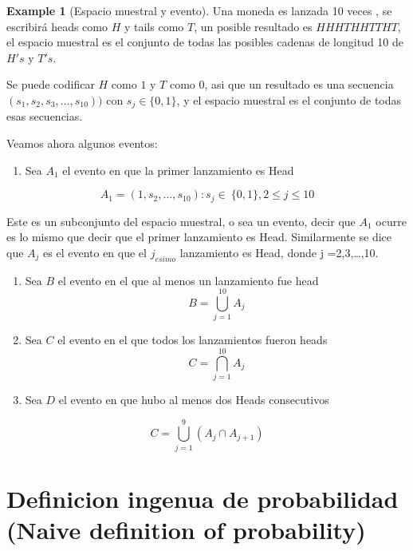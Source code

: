 \documentclass[
]{book}
\providecommand{\tightlist}{%
  \setlength{\itemsep}{0pt}\setlength{\parskip}{0pt}}
\theoremstyle{definition}
\theoremstyle{definition}
\newtheorem{example}{Example}[chapter]
\theoremstyle{definition}
\theoremstyle{definition}
\theoremstyle{remark}
\begin{document}
\begin{example}[Espacio muestral y evento]
\protect\hypertarget{exm:coins}{}\label{exm:coins}Una moneda es lanzada 10 veces , se escribirá heads como \(H\) y tails como \(T\), un posible resultado es \(HHHTHHTTHT\), el espacio muestral es el conjunto de todas las posibles cadenas de longitud 10 de \(H's\) y \(T's\).

Se puede codificar \(H\) como \(1\) y \(T\) como \(0\), asi que un resultado es una secuencia \((s_1,s_2,s_3, ..., s_{10}))\) con \(s_j \in \{0, 1\}\), y el espacio muestral es el conjunto de todas esas secuencias.

Veamos ahora algunos eventos:

\begin{enumerate}
\def\labelenumi{\arabic{enumi}.}
\tightlist
\item
  Sea \(A_1\) el evento en que la primer lanzamiento es Head
\end{enumerate}

\[ A_1 = {(1,s_2, ...,s_{10}) }: s_j \in\ \{0,1\} , 2 \leq j  \leq  10\]

Este es un subconjunto del espacio muestral, o sea un evento, decir que \(A_1\) ocurre es lo mismo que decir que el primer lanzamiento es Head. Similarmente se dice que \(A_j\) es el evento en que el \(j_{esimo}\) lanzamiento es Head, donde j =2,3,\ldots,10.

\begin{enumerate}
\def\labelenumi{\arabic{enumi}.}
\setcounter{enumi}{1}
\item
  Sea \(B\) el evento en el que al menos un lanzamiento fue head \[ B =   \bigcup_{j=1}^{10} A_j  \]
\item
  Sea \(C\) el evento en el que todos los lanzamientos fueron heads \[ C =   \bigcap_{j=1}^{10} A_j  \]
\item
  Sea \(D\) el evento en que hubo al menos dos Heads consecutivos
\end{enumerate}

\[ C =   \bigcup_{j=1}^{9} ( A_j \cap A_{j+1} )   \]
\end{example}

\hypertarget{definicion-ingenua-de-probabilidad-naive-definition-of-probability}{%
\section{Definicion ingenua de probabilidad (Naive definition of probability)}\label{definicion-ingenua-de-probabilidad-naive-definition-of-probability}}
\end{document}
